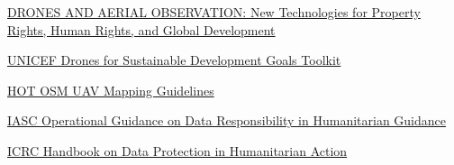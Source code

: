 \documentclass[
  a4paper,
  onecolumn,
  oneside]{book}
\newlength{\cslhangindent}
\newlength{\cslentryspacingunit} %
\newenvironment{CSLReferences}[2] %
 {%
  \setlength{\parindent}{0pt}
  \ifodd #1
  \let\oldpar\par
  \def\par{\hangindent=\cslhangindent\oldpar}
  \fi
  \setlength{\parskip}{#2\cslentryspacingunit}
 }%
 {}
\begin{document}
\hypertarget{refs}{}
\begin{CSLReferences}{0}{0}
\end{CSLReferences}

\href{http://drones.newamerica.org/primer/}{DRONES AND AERIAL
OBSERVATION: New Technologies for Property Rights, Human Rights, and
Global Development}

\href{https://unicef.github.io/drone-4sdgtoolkit/}{UNICEF Drones for
Sustainable Development Goals Toolkit}

\href{https://uav-guidelines.openaerialmap.org/}{HOT OSM UAV Mapping
Guidelines}

\href{https://interagencystandingcommittee.org/operational-response/iasc-operational-guidance-data-responsibility-humanitarian-action\#:~:text=Data\%20responsibility\%20in\%20humanitarian\%20action\%20is\%20the\%20safe\%2C\%20ethical\%20and,and\%20the\%20stakes\%20are\%20high.}{IASC
Operational Guidance on Data Responsibility in Humanitarian Guidance}

\href{https://www.icrc.org/en/data-protection-humanitarian-action-handbook}{ICRC
Handbook on Data Protection in Humanitarian Action}


\backmatter
\end{document}
